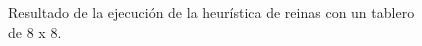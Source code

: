 \begin{figure}[H]
\centering
\medskip
\newgame
{}
\showboard
\caption{Resultado de la ejecución de la heurística de reinas con un tablero de 8 x 8.} \label{fig:t8rein03}
\end{figure}